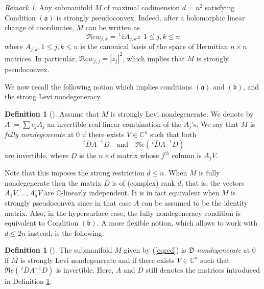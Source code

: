 \documentclass[12pt]{amsart}
\newcommand{\C}{\mathbb C}
\newcommand{\transp}{\,^t}
\newcommand{\aaa}{\mathfrak{(a)}}
\newcommand{\bbb}{\mathfrak{(b)}}
\theoremstyle{remark}
\newtheorem{remark}[theo]{Remark}
\theoremstyle{example}
\theoremstyle{definition}
\newtheorem{defi}[theo]{Definition}
\numberwithin{equation}{section}
\begin{document}
\begin{remark}
Any submanifold $M$ of maximal codimension $d=n^2$   satisfying Condition $\aaa$  is strongly pseudoconvex.  
Indeed, after a  holomorphic linear change of coordinates, $M$ can be written as	
\begin{equation*}
\Re e  w_{j,k}=\transp \overline{z} A_{j,k} z \ \ 1\leq j,k \leq n
\end{equation*}
where $A_{j,k}, 1\leq j,k \leq n$ is the canonical basis of the space of Hermitian $n\times n$ matrices. In particular, $\Re e  w_{j,j}=|z_j|^2$, which implies  that $M$  is strongly  pseudoconvex.
\end{remark}
 

We  now recall  the following notion  which implies conditions $\aaa$ and $\bbb$, and the strong  Levi nondegeneracy. 




\begin{defi} [\cite{be-bl-me}]\label{deffully} 
Assume that $M$ is  strongly Levi 
nondegenerate. We denote by $A:=\sum c_jA_j$ an invertible real linear combination of the $A_j$'s. 
We say that  $M$ is {\it fully nondegenerate} at 0 if  there exists $V \in \C^{n}$ 
such that both $$\transp \overline D A^{-1}D \ \ \ \mbox{ and } \ \ \ \Re e \left(\transp \overline D A^{-1}D\right)$$ are invertible, where $D$ is the $n \times d$ matrix whose $j^{th}$ column is $A_jV$.  
\end{defi}
Note that this imposes the strong restriction $d\leq n$. When $M$ is fully nondegenerate then the matrix $D$ is of (complex) rank $d$, that is, the vectors $A_1V,\ldots,A_dV$ are $\C$-linearly independent. It is in fact equivalent when $M$ is strongly pseudoconvex since in that case $A$ can be assumed to be the identity matrix. 
Also, in the hypersurface case, the fully nondegeneracy condition is  equivalent to Condition $\bbb.$ A more flexible notion, which  allows to work with $d \le 2n$  instead, is the following.     
\begin{defi} [\cite{be-me}]\label{defect} 
The submanifold $M$ given by  (\ref{eqred}) is {\it$\mathfrak{D}$-nondegenerate} at 0 if $M$ is strongly Levi 
nondegenerate and  if there exists $V \in \C^n$  such that  $\Re e (\transp \overline D A^{-1}D)$ is invertible. Here, $A$ and $D$ still denotes the matrices introduced in Definition \ref{deffully}. 
\end{defi}
\end{document}
